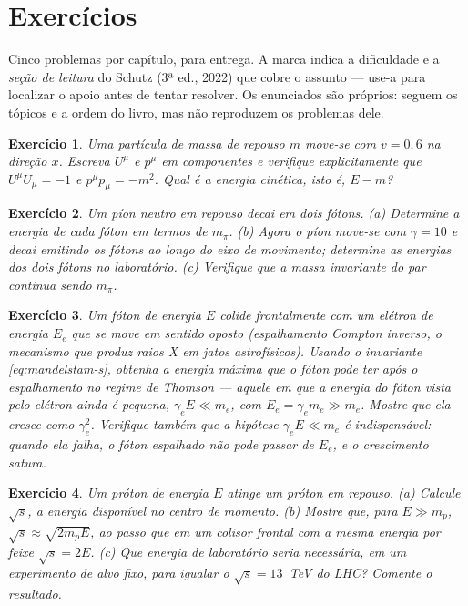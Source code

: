\documentclass[12pt,a4paper,oneside]{book}
\theoremstyle{rgplain}
\newtheorem{exercise}{Exercício}[chapter]
\theoremstyle{rgremark}
\begin{document}
\clearpage
\section{Exercícios}
\begin{leitura}
Cinco problemas por capítulo, para entrega. A marca indica a dificuldade e a \emph{seção de leitura} do Schutz (3ª ed., 2022) que cobre o assunto --- use-a para localizar o apoio antes de tentar resolver. Os enunciados são próprios: seguem os tópicos e a ordem do livro, mas não reproduzem os problemas dele.
\end{leitura}

\begin{exercise}
Uma partícula de massa de repouso $m$ move-se com $v=0{,}6$ na direção $x$.
Escreva $U^\mu$ e $p^\mu$ em componentes e verifique explicitamente que
$U^\mu U_\mu=-1$ e $p^\mu p_\mu=-m^2$. Qual é a energia cinética, isto é,
$E-m$?
\end{exercise}

\begin{exercise}
Um píon neutro em repouso decai em dois fótons. (a) Determine a energia de
cada fóton em termos de $m_\pi$. (b) Agora o píon move-se com
$\gamma=10$ e decai emitindo os fótons ao longo do eixo de movimento;
determine as energias dos dois fótons no laboratório. (c) Verifique que a
massa invariante do par continua sendo $m_\pi$.
\end{exercise}

\begin{exercise}
\label{ex:compton-inverso}
Um fóton de energia $E$ colide frontalmente com um elétron de energia $E_e$
que se move em sentido oposto (espalhamento Compton inverso, o mecanismo que
produz raios X em jatos astrofísicos). Usando o invariante
\eqref{eq:mandelstam-s}, obtenha a energia máxima que o fóton pode ter após o
espalhamento no regime de Thomson --- aquele em que a energia do fóton
\emph{vista pelo elétron} ainda é pequena, $\gamma_eE\ll m_e$, com
$E_e=\gamma_em_e\gg m_e$. Mostre que ela cresce como $\gamma_e^2$. Verifique
também que a hipótese $\gamma_eE\ll m_e$ é indispensável: quando ela falha, o
fóton espalhado não pode passar de $E_e$, e o crescimento satura.
\end{exercise}

\begin{exercise}
Um próton de energia $E$ atinge um próton em repouso. (a) Calcule
$\sqrt{s}$, a energia disponível no centro de momento. (b) Mostre que, para
$E\gg m_p$, $\sqrt{s}\approx\sqrt{2m_pE}$, ao passo que em um colisor frontal
com a mesma energia por feixe $\sqrt{s}=2E$. (c) Que energia de laboratório
seria necessária, em um experimento de alvo fixo, para igualar o
$\sqrt{s}=13$~TeV do LHC? Comente o resultado.
\end{exercise}
\end{document}
